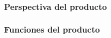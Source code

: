 \documentclass{article}
\begin{document}
        \subsubsection{Perspectiva del producto}







        \subsubsection{Funciones del producto}














\end{document}
